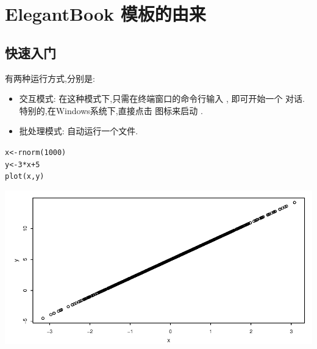 \documentclass[color=green,mathpazo,titlestyle=hang]{elegantbook}\usepackage[]{graphicx}\usepackage[]{color}
\author{方 莲}
\makeatletter
\def\maxwidth{ %
  \ifdim\Gin@nat@width>\linewidth
    \linewidth
  \else
    \Gin@nat@width
  \fi
}
\newcommand{\hlnum}[1]{\textcolor[rgb]{0,0.533,0.298}{#1}}%
\newcommand{\hlopt}[1]{\textcolor[rgb]{0.251,0.251,0.251}{#1}}%
\newcommand{\hlstd}[1]{\textcolor[rgb]{0.251,0.251,0.251}{#1}}%
\newcommand{\hlkwb}[1]{\textcolor[rgb]{0.69,0.424,0.345}{#1}}%
\newcommand{\hlkwd}[1]{\textcolor[rgb]{0.6,0,0}{#1}}%
\newenvironment{kframe}{%
 \def\at@end@of@kframe{}%
 \ifinner\ifhmode%
  \def\at@end@of@kframe{\end{minipage}}%
  \begin{minipage}{\columnwidth}%
 \fi\fi%
 \def\FrameCommand##1{\hskip\@totalleftmargin \hskip-\fboxsep
 \colorbox{shadecolor}{##1}\hskip-\fboxsep
     \hskip-\linewidth \hskip-\@totalleftmargin \hskip\columnwidth}%
 \MakeFramed {\advance\hsize-\width
   \@totalleftmargin\z@ \linewidth\hsize
   \@setminipage}}%
 {\par\unskip\endMakeFramed%
 \at@end@of@kframe}
\newenvironment{knitrout}{}{} %
\makeatother
\begin{document}






\maketitle
\tableofcontents
\mainmatter
\chapter{ElegantBook 模板的由来}
\section{快速入门}
 有两种运行方式,分别是:
\begin{itemize}
\item 交互模式: 在这种模式下,只需在终端窗口的命令行输入 , 即可开始一个 对话. 特别的,在Windows系统下,直接点击 图标来启动 .
\item 批处理模式: 自动运行一个文件.
\end{itemize}
\begin{knitrout}\footnotesize
{}\color{fgcolor}\begin{kframe}
\begin{alltt}
\hlstd{x} \hlkwb{<-} \hlkwd{rnorm}\hlstd{(}\hlnum{1000}\hlstd{)}
\hlstd{y} \hlkwb{<-} \hlnum{3} \hlopt{*} \hlstd{x} \hlopt{+} \hlnum{5}
\hlkwd{plot}\hlstd{(x, y)}
\end{alltt}
\end{kframe}

{\centering \includegraphics[width=\maxwidth]{figure/listings-unnamed-chunk-1} 

}



\end{knitrout}
\end{document}
